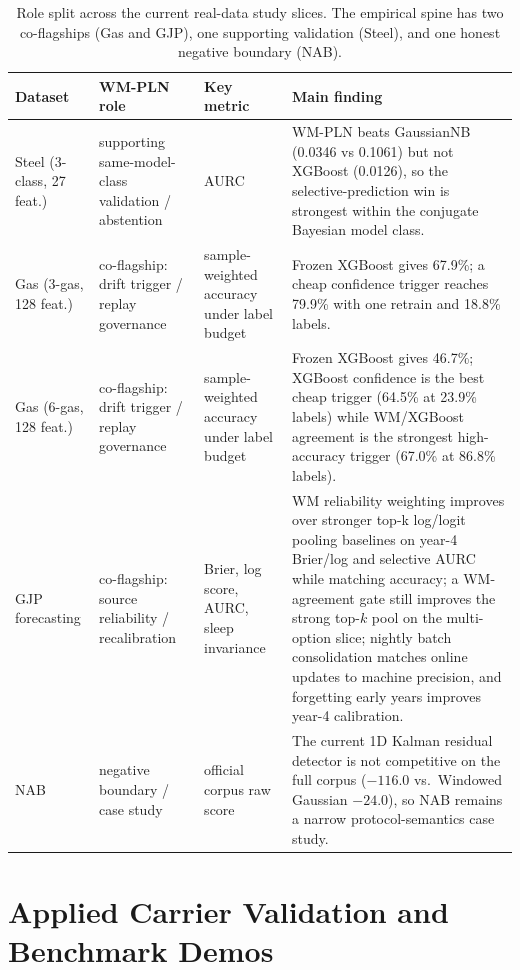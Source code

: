 \documentclass[11pt,openany]{report}
\begin{document}
\begin{table}[htbp]
\centering
\footnotesize
\setlength{\tabcolsep}{4pt}
\renewcommand{\arraystretch}{0.96}
\caption{Role split across the current real-data study slices.  The empirical
  spine has two co-flagships (Gas and GJP), one supporting validation
  (Steel), and one honest negative boundary (NAB).}
\label{tab:dataset-role-split}
\begin{tabular}{p{2.4cm}p{3.2cm}p{3.2cm}p{5.4cm}}
\toprule
Dataset & WM-PLN role & Key metric & Main finding \\
\midrule
Steel (3-class, 27 feat.) &
supporting same-model-class validation / abstention &
AURC &
WM-PLN beats GaussianNB (0.0346 vs 0.1061) but not XGBoost (0.0126), so the selective-prediction win is strongest within the conjugate Bayesian model class. \\
\addlinespace
Gas (3-gas, 128 feat.) &
co-flagship: drift trigger / replay governance &
sample-weighted accuracy under label budget &
Frozen XGBoost gives 67.9\%; a cheap confidence trigger reaches 79.9\% with one retrain and 18.8\% labels. \\
\addlinespace
Gas (6-gas, 128 feat.) &
co-flagship: drift trigger / replay governance &
sample-weighted accuracy under label budget &
Frozen XGBoost gives 46.7\%; XGBoost confidence is the best cheap trigger (64.5\% at 23.9\% labels) while WM/XGBoost agreement is the strongest high-accuracy trigger (67.0\% at 86.8\% labels). \\
\addlinespace
GJP forecasting &
co-flagship: source reliability / recalibration &
Brier, log score, AURC, sleep invariance &
WM reliability weighting improves over stronger top-k log/logit pooling baselines on year-4 Brier/log and selective AURC while matching accuracy; a WM-agreement gate still improves the strong top-$k$ pool on the multi-option slice; nightly batch consolidation matches online updates to machine precision, and forgetting early years improves year-4 calibration. \\
\addlinespace
NAB &
negative boundary / case study &
official corpus raw score &
The current 1D Kalman residual detector is not competitive on the full corpus ($-116.0$ vs.\ Windowed Gaussian $-24.0$), so NAB remains a narrow protocol-semantics case study. \\
\bottomrule
\end{tabular}
\end{table}

\section{Applied Carrier Validation and Benchmark Demos}
\label{sec:carrier-benchmarks}
\end{document}
